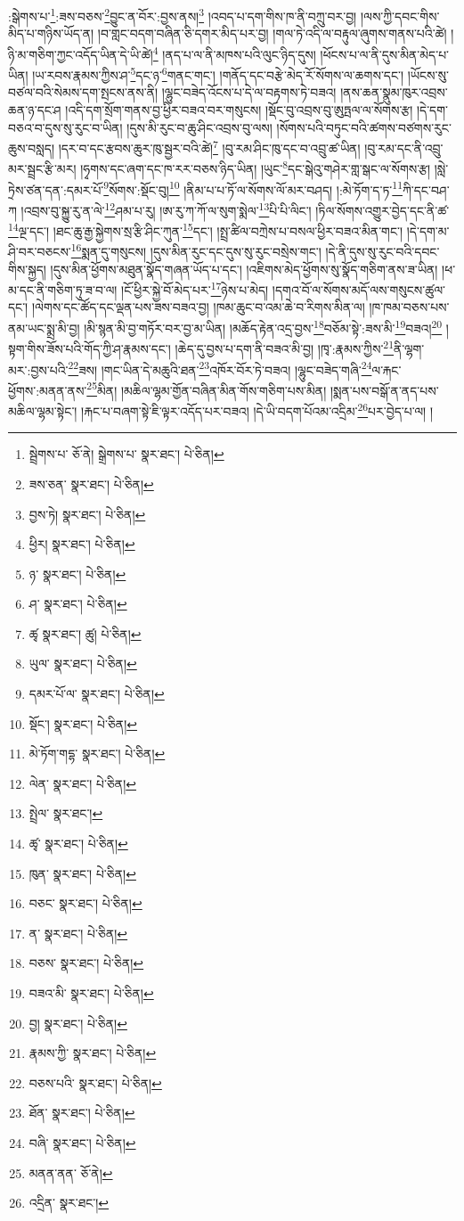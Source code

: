:སྒེགས་པ་\footnote{སྦྲེགས་པ་  ཅོ་ནེ། སྒྲེགས་པ་  སྣར་ཐང་།  པེ་ཅིན། }:ཟས་བཅས་\footnote{ཟས་ཅན་  སྣར་ཐང་།  པེ་ཅིན། }བྱུང་ན་བོར་:བྱས་ནས།\footnote{བྱས་ཏེ།  སྣར་ཐང་།  པེ་ཅིན། } །འབད་པ་དག་གིས་ཁ་ནི་བཀྲུ་བར་བྱ། །ལས་ཀྱི་དབང་གིས་མིད་པ་གཉིས་ཡོད་ན། །བ་གླང་བདག་བཞིན་ཅི་དགར་མིད་པར་བྱ། །གལ་ཏེ་འདི་ལ་བརྟུལ་ཞུགས་གནས་པའི་ཚེ། །ཉི་མ་གཅིག་ཀྱང་འདོད་ཡིན་དེ་ཡི་ཚེ།\footnote{ཕྱིར།  སྣར་ཐང་།  པེ་ཅིན། } །ནད་པ་ལ་ནི་མཁས་པའི་ལུང་ཉིད་དུས། །ཕོངས་པ་ལ་ནི་དུས་མིན་མེད་པ་ཡིན། །ཡ་རབས་རྣམས་ཀྱིས་ཤ་\footnote{ཉ་  སྣར་ཐང་།  པེ་ཅིན། }དང་ཉ་\footnote{ཤ་  སྣར་ཐང་།  པེ་ཅིན། }གནང་གང་། །གནོད་དང་བརྩེ་མེད་རོ་སོགས་ལ་ཆགས་དང་། །ཡོངས་སུ་བཙལ་བའི་སེམས་དག་སྤངས་ནས་ནི། །ལྷུང་བཟེད་འོངས་པ་དེ་ལ་བརྟགས་ཏེ་བཟའ། །ནས་ཆན་སྣུམ་ཁུར་འབྲས་ཆན་ཉ་དང་ཤ །འདི་དག་སྲོག་གནས་བྱ་ཕྱིར་བཟའ་བར་གསུངས། །སྡོང་བུ་འབྲས་བུ་ཨུཏྤལ་ལ་སོགས་རྩ། །དེ་དག་བཅའ་བ་དུས་སུ་རུང་བ་ཡིན། །དུས་མི་རུང་བ་ཆུ་ཤིང་འབྲས་བུ་ལས། །སོགས་པའི་བཏུང་བའི་ཚགས་བཙགས་རུང་ཆུས་བསླད། །དར་བ་དང་རྩབས་ཆུར་ཁུ་སྦྱར་བའི་ཚེ།\footnote{ཚྭ  སྣར་ཐང་། ཚུ།  པེ་ཅིན། } །བུ་རམ་ཤིང་ཁུ་དང་བ་འབྲུ་ཚ་ཡིན། །བུ་རམ་དང་ནི་འབྲུ་མར་སྦྲང་རྩི་མར། །ཧྭགས་དང་ཞག་དང་ཁ་རར་བཅས་ཉིད་ཡིན། །ཡུང་\footnote{ཡུལ་  སྣར་ཐང་།  པེ་ཅིན། }དང་སྒེའུ་གཤེར་གླ་སྒང་ལ་སོགས་རྩ། །སླེ་ཏྲེས་ཙན་དན་:དམར་པོ་\footnote{དམར་པོ་ལ་  སྣར་ཐང་།  པེ་ཅིན། }སོགས་:སྡོང་བུ།\footnote{སྡོང་།  སྣར་ཐང་།  པེ་ཅིན། } །ནིམ་པ་པ་ཏོ་ལ་སོགས་ལོ་མར་བཤད། །:མེ་ཏོག་ད་ཏ་\footnote{མེ་ཏོག་གདྷ་  སྣར་ཐང་།  པེ་ཅིན། }ཀི་དང་བཤ་ཀ །འབྲས་བུ་སྐྱུ་རུ་ན་ལེ་\footnote{ལེན་  སྣར་ཐང་།  པེ་ཅིན། }ཤམ་པ་རུ། །ཨ་རུ་ཀ་ཀོ་ལ་སུག་སྨེལ་\footnote{སྤྲེལ་  སྣར་ཐང་། }པི་པི་ལིང་། །ཏིལ་སོགས་འགྱུར་བྱེད་དང་ནི་ཚ་\footnote{ཚྭ་  སྣར་ཐང་།  པེ་ཅིན། }ལྔ་དང་། །ཐང་ཆུ་རྒྱ་སྐྱེགས་སྲ་རྩི་ཤིང་ཀུན་\footnote{ཁུན་  སྣར་ཐང་།  པེ་ཅིན། }དང་། །སྤྲ་ཚིལ་བཀྲེས་པ་བསལ་ཕྱིར་བཟའ་མིན་གང་། །དེ་དག་མ་ཤི་བར་བཅངས་\footnote{བཅང་  སྣར་ཐང་།  པེ་ཅིན། }སྨན་དུ་གསུངས། །དུས་མིན་རུང་དང་དུས་སུ་རུང་བསྲེས་གང་། །དེ་ནི་དུས་སུ་རུང་བའི་དབང་གིས་སྐྱད། །དུས་མིན་ཕྱོགས་མཐུན་སྣོད་གཞན་ཡོད་པ་དང་། །འཇིགས་མེད་ཕྱོགས་སུ་སྣོད་གཅིག་ནས་ཟ་ཡིན། །ཕ་མ་དང་ནི་གཅིག་ཏུ་ཟ་བ་ལ། །ངོ་ཕྱིར་སྐྱེ་བོ་མེད་པར་\footnote{ན་  སྣར་ཐང་།  པེ་ཅིན། }ཉེས་པ་མེད། །དགའ་བོ་ལ་སོགས་མདོ་ལས་གསུངས་ཚུལ་དང་། །ལེགས་དང་ཚོད་དང་ལྡན་པས་ཟས་བཟའ་བྱ། །ཁམ་ཆུང་བ་འམ་ཆེ་བ་རིགས་མིན་ལ། །ཁ་ཁམ་བཅས་པས་ནམ་ཡང་སྨྲ་མི་བྱ། །མི་སྙན་མི་བྱ་གཏོར་བར་བྱ་མ་ཡིན། །མཆོད་རྟེན་འདྲ་བྱས་\footnote{བཅས་  སྣར་ཐང་།  པེ་ཅིན། }བཅོམ་སྟེ་:ཟས་མི་\footnote{བཟའ་མི་  སྣར་ཐང་།  པེ་ཅིན། }བཟའ།\footnote{བྱ།  སྣར་ཐང་།  པེ་ཅིན། } །སྟག་གིས་ཟོས་པའི་གོད་ཀྱི་ཤ་རྣམས་དང་། །ཆེད་དུ་བྱས་པ་དག་ནི་བཟའ་མི་བྱ། །ཁྭ་:རྣམས་ཀྱིས་\footnote{རྣམས་ཀྱི་  སྣར་ཐང་།  པེ་ཅིན། }ནི་ལྷག་མར་:བྱས་པའི་\footnote{བཅས་པའི་  སྣར་ཐང་།  པེ་ཅིན། }ཟས། །གང་ཡིན་དེ་མཆུའི་ཐན་\footnote{ཐོན་  སྣར་ཐང་།  པེ་ཅིན། }འཁོར་བོར་ཏེ་བཟའ། །ལྷུང་བཟེད་གཞི་\footnote{བཞི་  སྣར་ཐང་།  པེ་ཅིན། }ལ་རྐང་ཕྱོགས་:མནན་ནས་\footnote{མནན་ནན་  ཅོ་ནེ། }མིན། །མཆིལ་ལྷམ་གྱོན་བཞིན་མིན་གོས་གཅིག་པས་མིན། །སྨན་པས་བསྒོ་ན་ནད་པས་མཆིལ་ལྷམ་སྟེང་། །རྐང་པ་བཞག་སྟེ་ཇི་ལྟར་འདོད་པར་བཟའ། །དེ་ཡི་བདག་པོའམ་འདྲིམ་\footnote{འདྲིན་  སྣར་ཐང་། }པར་བྱེད་པ་ལ། །
